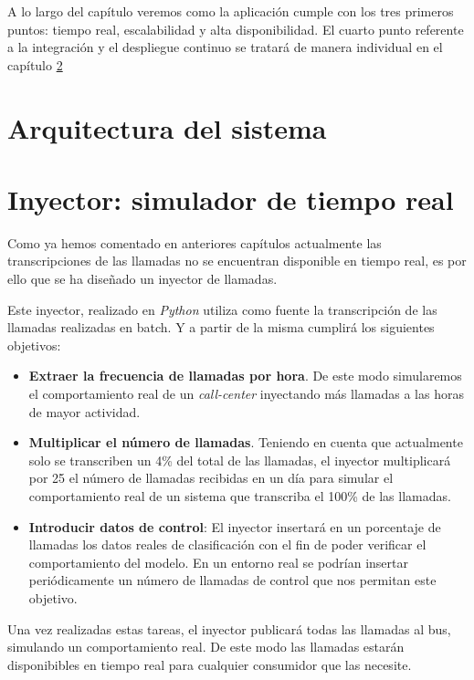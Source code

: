 A lo largo del capítulo veremos como la aplicación cumple con los tres primeros puntos: tiempo real, escalabilidad y alta disponibilidad. El cuarto punto referente a la integración y el despliegue continuo se tratará de manera individual en el capítulo \ref{}

\section{Arquitectura del sistema}



\section{Inyector: simulador de tiempo real}
Como ya hemos comentado en anteriores capítulos actualmente las transcripciones de las llamadas no se encuentran disponible en tiempo real, es por ello que se ha diseñado un inyector de llamadas.

Este inyector, realizado en \textit{Python} utiliza como fuente la transcripción de las llamadas realizadas en batch. Y a partir de la misma cumplirá los siguientes objetivos: 

\begin{itemize}
	\item \textbf{ Extraer la frecuencia de llamadas por hora}. De este modo simularemos el comportamiento real de un \textit{call-center} inyectando más llamadas a las horas de mayor actividad.
	\item \textbf{Multiplicar el número de llamadas}. Teniendo en cuenta que actualmente solo se transcriben un 4\% del total de las llamadas, el inyector multiplicará por 25 el número de llamadas recibidas en un día para simular el comportamiento real de un sistema que transcriba el 100\% de las llamadas.
	\item \textbf{Introducir datos de control}: El inyector insertará en un porcentaje de llamadas los datos reales de clasificación con el fin de poder verificar el comportamiento del modelo. En un entorno real se podrían insertar periódicamente un número de llamadas de control que nos permitan este objetivo.
	
\end{itemize}

Una vez realizadas estas tareas, el inyector publicará todas las llamadas al bus, simulando un comportamiento real. De este modo las llamadas estarán disponibibles en tiempo real para cualquier consumidor que las necesite.




